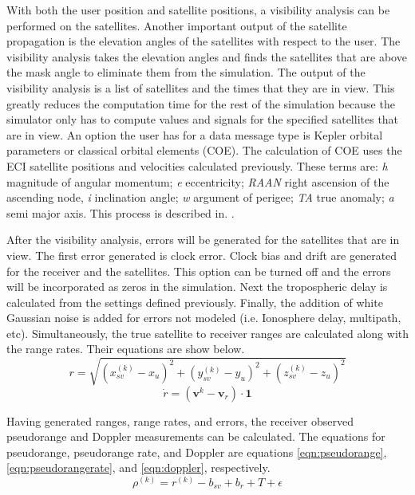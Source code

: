 \documentclass[12pt]{report}
\begin{document}
With both the user position and satellite positions, a visibility analysis can be performed on the satellites. Another important output of the satellite propagation is the elevation angles of the satellites with respect to the user. The visibility analysis takes the elevation angles and finds the satellites that are above the mask angle to eliminate them from the simulation. The output of the visibility analysis is a list of satellites and the times that they are in view. This greatly reduces the computation time for the rest of the simulation because the simulator only has to compute values and signals for the specified satellites that are in view. An option the user has for a data message type is Kepler orbital parameters or classical orbital elements (COE). The calculation of COE uses the ECI satellite positions and velocities calculated previously. These terms are: \textit{h} magnitude of angular momentum; \textit{e} eccentricity; \textit{RAAN} right ascension of the ascending node, \textit{i} inclination angle; \textit{w} argument of perigee; \textit{TA} true anomaly; \textit{a} semi major axis. This process is described in. \cite{curtisOrbitalMechanicsEngineering2008}.

After the visibility analysis, errors will be generated for the satellites that are in view. The first error generated is clock error. Clock bias and drift are generated for the receiver and the satellites. This option can be turned off and the errors will be incorporated as zeros in the simulation. Next the tropospheric delay is calculated from the settings defined previously. Finally, the addition of white Gaussian noise is added for errors not modeled (i.e. Ionosphere delay, multipath, etc). Simultaneously, the true satellite to receiver ranges are calculated along with the range rates. Their equations are show below.
\begin{equation}
    r = \sqrt{(x^{(k)}_{sv} - x_u)^2 + (y^{(k)}_{sv} - y_u)^2 + (z^{(k)}_{sv} - z_u)^2}
    \label{eqn:rangeeqn}
\end{equation}
\begin{equation}
    \dot{r} = (\mathbf{v}^{k} - \mathbf{v}_r) \cdot \mathbf{1}
    \label{eqn:rangerate}
\end{equation}

Having generated ranges, range rates, and errors, the receiver observed pseudorange and Doppler measurements can be calculated. The equations for pseudorange, pseudorange rate, and Doppler are equations \ref{eqn:pseudorange}, \ref{eqn:pseudorangerate}, and \ref{eqn:doppler}, respectively.
\begin{equation}
    \rho^{(k)} = r^{(k)} - b_{sv} + b_r + T +\epsilon
    \label{eqn:pseudorange}
\end{equation}
\end{document}
